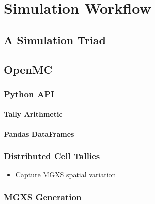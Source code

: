 \chapter{Simulation Workflow}
\label{chap:simulation-workflow}

\section{A Simulation Triad}
\label{chap3:triad}


\section{OpenMC}
\label{sec:chap3-openmc}

\subsection{Python API}
\label{sec:chap3-py-api}

\subsubsection{Tally Arithmetic}
\label{sec:chap3-tally-arithmetic}

\subsubsection{Pandas DataFrames}
\label{sec:chap3-pandas-df}

\subsection{Distributed Cell Tallies}
\label{sec:chap3-distribcells}

\begin{itemize}
  \item Capture \ac{MGXS} spatial variation
\end{itemize}

\subsection{MGXS Generation}
\label{sec:chap3-mgxs}

